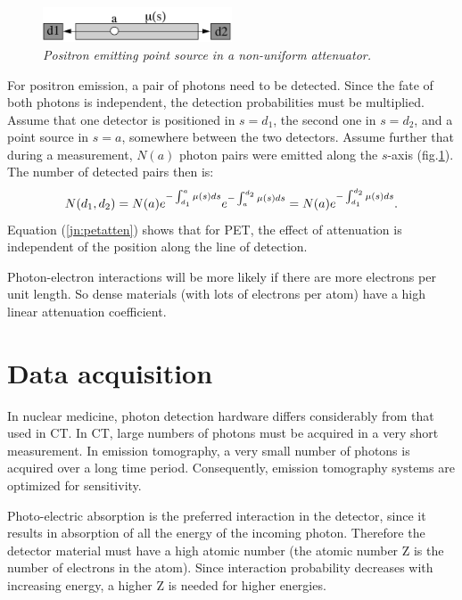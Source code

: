 \documentclass[11pt,oneside]{book}
\begin{document}
\begin{figure}[tb]
\centering
\includegraphics[width=0.5\textwidth]{figs/fig_jnpetatten.pdf}
\caption{\label{fig:jn_petatten} \emph{Positron emitting point source in a
non-uniform attenuator.}}
\end{figure}
For positron emission, a pair of photons need to be detected. Since the fate
of both photons is independent, the detection probabilities must be
multiplied.  Assume that one detector is positioned in $s = d_1$, the second
one in $s = d_2$, and a point source in $s = a$, somewhere between the two
detectors. Assume further that during a measurement, $N(a)$ photon pairs were
emitted along the $s$-axis (fig.\ref{fig:jn_petatten}). The number of
detected pairs then is:
\begin{equation}
  N(d_1,d_2) = N(a)  e^{- \int_{d_1}^a \mu(s) ds} e^{- \int_a^{d_2} \mu(s)
             ds} \\
             = N(a)  e^{- \int_{d_1}^{d_2} \mu(s) ds}. \\
\label{jn:petatten}
\end{equation}
Equation (\ref{jn:petatten}) shows that for PET, the effect of attenuation is
independent of the position along the line of detection.

Photon-electron interactions will be more likely if there are more electrons
per unit length. So dense materials (with lots of electrons per atom) have a
high linear attenuation coefficient.

\chapter{Data acquisition}

In nuclear medicine, photon detection hardware differs considerably from that
used in CT. In CT, large numbers of photons must be acquired in a very short
measurement. In emission tomography, a very small number of photons is
acquired over a long time period. Consequently, emission tomography systems are
optimized for sensitivity.

Photo-electric absorption is the preferred interaction in the detector, since
it results in absorption of all the energy of the incoming photon. Therefore
the detector material must have a high atomic number (the atomic number Z is
the number of electrons in the atom). Since interaction probability decreases
with increasing energy, a higher Z is needed for higher energies.
\end{document}
